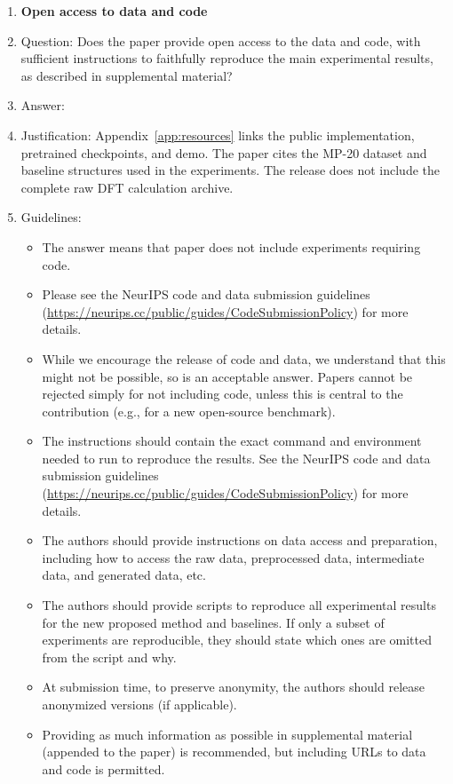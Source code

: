 \documentclass{article}
\theoremstyle{plain}
\theoremstyle{definition}
\theoremstyle{remark}
\begin{document}
\begin{enumerate}
\item {\bf Open access to data and code}
    \item[] Question: Does the paper provide open access to the data and code, with sufficient instructions to faithfully reproduce the main experimental results, as described in supplemental material?
    \item[] Answer: \answerYes{} %
    \item[] Justification: Appendix~\ref{app:resources} links the public implementation, pretrained checkpoints, and demo. The paper cites the MP-20 dataset and baseline structures used in the experiments. The release does not include the complete raw DFT calculation archive.
    \item[] Guidelines:
    \begin{itemize}
        \item The answer \answerNA{} means that paper does not include experiments requiring code.
        \item Please see the NeurIPS code and data submission guidelines (\url{https://neurips.cc/public/guides/CodeSubmissionPolicy}) for more details.
        \item While we encourage the release of code and data, we understand that this might not be possible, so \answerNo{} is an acceptable answer. Papers cannot be rejected simply for not including code, unless this is central to the contribution (e.g., for a new open-source benchmark).
        \item The instructions should contain the exact command and environment needed to run to reproduce the results. See the NeurIPS code and data submission guidelines (\url{https://neurips.cc/public/guides/CodeSubmissionPolicy}) for more details.
        \item The authors should provide instructions on data access and preparation, including how to access the raw data, preprocessed data, intermediate data, and generated data, etc.
        \item The authors should provide scripts to reproduce all experimental results for the new proposed method and baselines. If only a subset of experiments are reproducible, they should state which ones are omitted from the script and why.
        \item At submission time, to preserve anonymity, the authors should release anonymized versions (if applicable).
        \item Providing as much information as possible in supplemental material (appended to the paper) is recommended, but including URLs to data and code is permitted.
    \end{itemize}



\end{enumerate}
\end{document}
